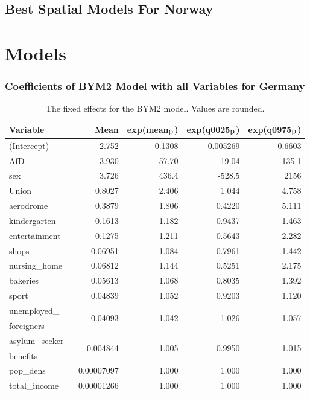 \subsection{Best Spatial Models For Norway}

\clearpage
\section{Models}
\subsubsection{Coefficients of BYM2 Model with all Variables for Germany}
\begin{table}[H] 
\caption{The fixed effects for the BYM2 model. Values are rounded. \label{allGermanyBYM2}}
\begin{tabular}{l r r r r}
\toprule
\textbf{Variable}	& \textbf{Mean}	& \textbf{exp(mean$_{\hbox{p}}$)} & \textbf{exp(q0025$_{\hbox{p}}$)} & \textbf{exp(q0975$_{\hbox{p}}$)} \\
\midrule
(Intercept) & -2.752 & 0.1308 & 0.005269 & 0.6603\\
AfD & 3.930 & 57.70  & 19.04 & 135.1 \\
sex & 3.726 & 436.4 & -528.5 & 2156 \\
Union & 0.8027 & 2.406 & 1.044 & 4.758 \\
aerodrome & 0.3879 & 1.806 & 0.4220 & 5.111 \\
kindergarten & 0.1613 & 1.182 & 0.9437 & 1.463 \\
entertainment & 0.1275 & 1.211 & 0.5643 & 2.282 \\
shops & 0.06951 & 1.084 & 0.7961 & 1.442 \\
nursing\_home & 0.06812 & 1.144 & 0.5251 & 2.175 \\
bakeries & 0.05613 & 1.068 & 0.8035 & 1.392 \\
sport & 0.04839 & 1.052 &  0.9203 & 1.120 \\
unemployed\_ & \multirow{2}{*}{0.04093} & \multirow{2}{*}{1.042}  & \multirow{2}{*}{1.026} & \multirow{2}{*}{1.057}\\
foreigners  \\
asylum\_seeker\_ & \multirow{2}{*}{0.004844} & \multirow{2}{*}{1.005}  & \multirow{2}{*}{0.9950} & \multirow{2}{*}{1.015}\\
benefits  \\
pop\_dens & 0.00007097 & 1.000 & 1.000 & 1.000 \\
total\_income & 0.00001266 & 1.000 & 1.000 & 1.000 \\

\end{tabular}
\end{table}
